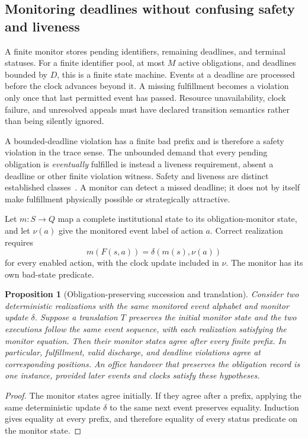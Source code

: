 \documentclass[11pt,letterpaper]{article}
\theoremstyle{plain}
\newtheorem{proposition}{Proposition}[section]
\theoremstyle{definition}
\theoremstyle{remark}
\begin{document}
\subsection{Monitoring deadlines without confusing safety and liveness}
A finite monitor stores pending identifiers, remaining deadlines, and terminal statuses. For a finite identifier pool, at most $M$ active obligations, and deadlines bounded by $D$, this is a finite state machine. Events at a deadline are processed before the clock advances beyond it. A missing fulfillment becomes a violation only once that last permitted event has passed. Resource unavailability, clock failure, and unresolved appeals must have declared transition semantics rather than being silently ignored.

A bounded-deadline violation has a finite bad prefix and is therefore a safety violation in the trace sense. The unbounded demand that every pending obligation is \emph{eventually} fulfilled is instead a liveness requirement, absent a deadline or other finite violation witness. Safety and liveness are distinct established classes~\cite{alpern}. A monitor can detect a missed deadline; it does not by itself make fulfillment physically possible or strategically attractive.

Let $m:S\to Q$ map a complete institutional state to its obligation-monitor state, and let $\nu(a)$ give the monitored event label of action $a$. Correct realization requires
\[
m(F(s,a))=\delta(m(s),\nu(a))
\]
for every enabled action, with the clock update included in $\nu$. The monitor has its own bad-state predicate.

\begin{proposition}[Obligation-preserving succession and translation]\label{prop:obligationtransport}
Consider two deterministic realizations with the same monitored event alphabet and monitor update $\delta$. Suppose a translation $T$ preserves the initial monitor state and the two executions follow the same event sequence, with each realization satisfying the monitor equation. Then their monitor states agree after every finite prefix. In particular, fulfillment, valid discharge, and deadline violations agree at corresponding positions. An office handover that preserves the obligation record is one instance, provided later events and clocks satisfy these hypotheses.
\end{proposition}
\begin{proof}
The monitor states agree initially. If they agree after a prefix, applying the same deterministic update $\delta$ to the same next event preserves equality. Induction gives equality at every prefix, and therefore equality of every status predicate on the monitor state.
\end{proof}
\end{document}

